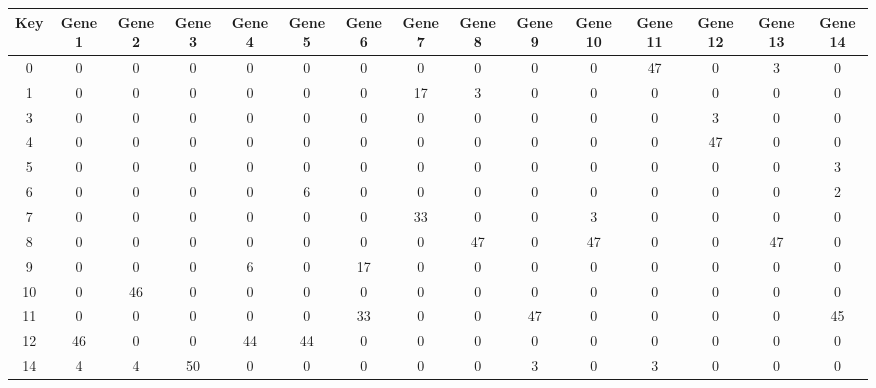 \begin{tabular}{|c|c|c|c|c|c|c|c|c|c|c|c|c|c|c|}
\hline
Key & Gene 1 & Gene 2 & Gene 3 & Gene 4 & Gene 5 & Gene 6 & Gene 7 & Gene 8 & Gene 9 & Gene 10 & Gene 11 & Gene 12 & Gene 13 & Gene 14 \\
\hline
0 & 0 & 0 & 0 & 0 & 0 & 0 & 0 & 0 & 0 & 0 & 47 & 0 & 3 & 0 \\
1 & 0 & 0 & 0 & 0 & 0 & 0 & 17 & 3 & 0 & 0 & 0 & 0 & 0 & 0 \\
3 & 0 & 0 & 0 & 0 & 0 & 0 & 0 & 0 & 0 & 0 & 0 & 3 & 0 & 0 \\
4 & 0 & 0 & 0 & 0 & 0 & 0 & 0 & 0 & 0 & 0 & 0 & 47 & 0 & 0 \\
5 & 0 & 0 & 0 & 0 & 0 & 0 & 0 & 0 & 0 & 0 & 0 & 0 & 0 & 3 \\
6 & 0 & 0 & 0 & 0 & 6 & 0 & 0 & 0 & 0 & 0 & 0 & 0 & 0 & 2 \\
7 & 0 & 0 & 0 & 0 & 0 & 0 & 33 & 0 & 0 & 3 & 0 & 0 & 0 & 0 \\
8 & 0 & 0 & 0 & 0 & 0 & 0 & 0 & 47 & 0 & 47 & 0 & 0 & 47 & 0 \\
9 & 0 & 0 & 0 & 6 & 0 & 17 & 0 & 0 & 0 & 0 & 0 & 0 & 0 & 0 \\
10 & 0 & 46 & 0 & 0 & 0 & 0 & 0 & 0 & 0 & 0 & 0 & 0 & 0 & 0 \\
11 & 0 & 0 & 0 & 0 & 0 & 33 & 0 & 0 & 47 & 0 & 0 & 0 & 0 & 45 \\
12 & 46 & 0 & 0 & 44 & 44 & 0 & 0 & 0 & 0 & 0 & 0 & 0 & 0 & 0 \\
14 & 4 & 4 & 50 & 0 & 0 & 0 & 0 & 0 & 3 & 0 & 3 & 0 & 0 & 0 \\
\hline
\end{tabular}